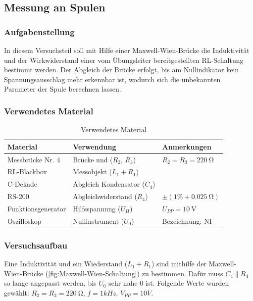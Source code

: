 \subsection{Messung an Spulen}\label{sec:3-2}
\subsubsection{Aufgabenstellung}

In diesem Versuchsteil soll mit Hilfe einer Maxwell-Wien-Brücke die Induktivität und der Wirkwiderstand einer vom Übungsleiter bereitgestellten RL-Schaltung bestimmt werden. Der Abgleich der Brücke erfolgt, bis am Nullindikator kein Spannungsausschlag mehr erkennbar ist, wodurch sich die unbekannten Parameter der Spule berechnen lassen.

\subsubsection{Verwendetes Material}

\begin{table}[h]
	\centering
	\caption{Verwendetes Material}
	\begin{tabularx}{\textwidth}{XXX}
		\textbf{Material}  & \textbf{Verwendung}          & \textbf{Anmerkungen}           \\ \midrule
		Messbrücke Nr. 4   & Brücke und ($R_2$, $R_3$)    & $R_2=R_3=\SI{220}{\ohm}$       \\
		RL-Blackbox        & Messobjekt ($L_1 + R_1$)     &                                \\
		C-Dekade           & Abgleich Kondensator ($C_4$) &                                \\
		RS-200             & Abgleichwiderstand ($R_4$)   & $\pm (1\% + \SI{0.025}{\ohm})$ \\
		Funktionsgenerator & Hilfsspannung ($U_H$)        & $U_{PP} = \SI{10}{\volt}$      \\
		Oszilloskop        & Nullinstrument ($U_0$)       & Bezeichnung: NI                \\
	\end{tabularx}
\end{table}

\subsubsection{Versuchsaufbau}

Eine Induktivität und ein Wiederstand ($L_1 + R_1$) sind mithilfe der
Maxwell-Wien-Brücke (\autoref{fig:Maxwell-Wien-Schaltung}) zu bestimmen. Dafür muss $C_4 \parallel R_4$ so lange angepasst werden, bis $U_0$ sehr nahe 0 ist. Folgende Werte wurden gewählt: $R_2=R_3=\SI{220}{\ohm}$, $f=1kHz$, $V_{PP}=10V$.


